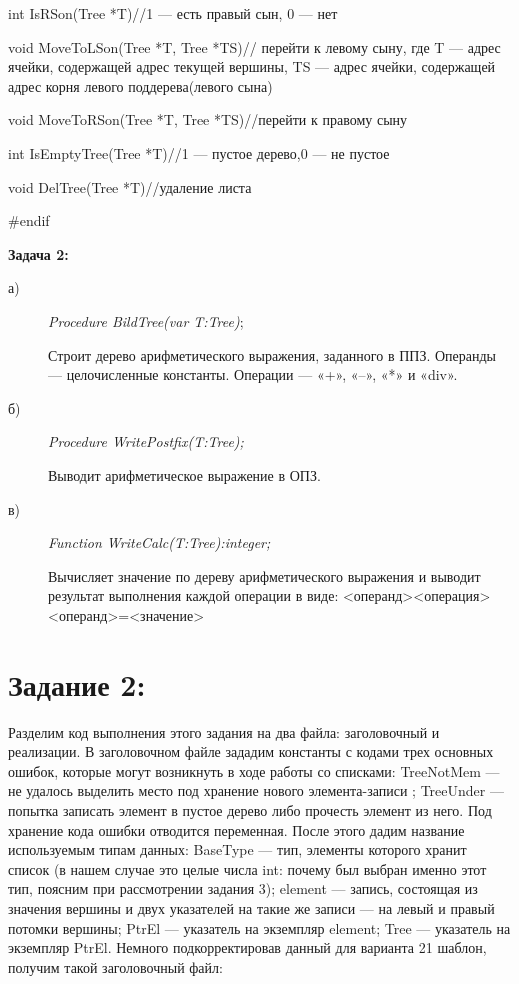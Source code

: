\documentclass[12pt]{article}
\begin{document}
{{		int IsRSon(Tree *T)//1 — есть правый сын, 0 — нет 
		
		void MoveToLSon(Tree *T, Tree *TS)// перейти к левому сыну, где T — адрес ячейки, содержащей адрес текущей вершины, TS — адрес ячейки, содержащей адрес корня левого поддерева(левого сына)
		
		void MoveToRSon(Tree *T, Tree *TS)//перейти к правому сыну
		
		int  IsEmptyTree(Tree *T)//1 — пустое дерево,0 — не пустое
		
		void DelTree(Tree *T)//удаление листа
		
		\#endif
	}

	
	{\bf Задача 2:} 
	
	\begin{description}
		\item[а)] {\it Procedure BildTree(var T:Tree)};
		
		Строит дерево арифметического выражения, заданного в ППЗ. Операнды — целочисленные константы. Операции — «+», «–», «*» и «div».
		
		\item[б)] {\it Procedure WritePostfix(T:Tree);}
	
		Выводит арифметическое выражение в ОПЗ.
	
		\item[в)] {\it Function WriteCalc(T:Tree):integer;}
	
		Вычисляет значение по дереву арифметического выражения и выводит результат выполнения каждой операции в виде: <операнд><операция><операнд>=<значение>
	\end{description}
	
	\section{Задание 2:}
	\label{task_2}
			
	Разделим код выполнения этого задания на два файла: заголовочный и  реализации. В заголовочном файле зададим константы с кодами трех основных ошибок, которые могут возникнуть в ходе работы со списками: TreeNotMem --- не удалось выделить место под хранение нового элемента-записи ; TreeUnder --- попытка записать элемент в пустое дерево либо прочесть элемент из него. Под хранение кода ошибки отводится переменная. После этого дадим название используемым типам данных: BaseType --- тип, элементы которого хранит список (в нашем случае это целые числа int: почему был выбран именно этот тип, поясним при рассмотрении задания 3); element --- запись, состоящая из значения вершины и двух указателей на такие же записи --- на левый и правый потомки вершины; PtrEl --- указатель на экземпляр element; Tree --- указатель на экземпляр PtrEl. Немного подкорректировав данный для варианта 21 шаблон, получим такой заголовочный файл:
		
}
\end{document}
